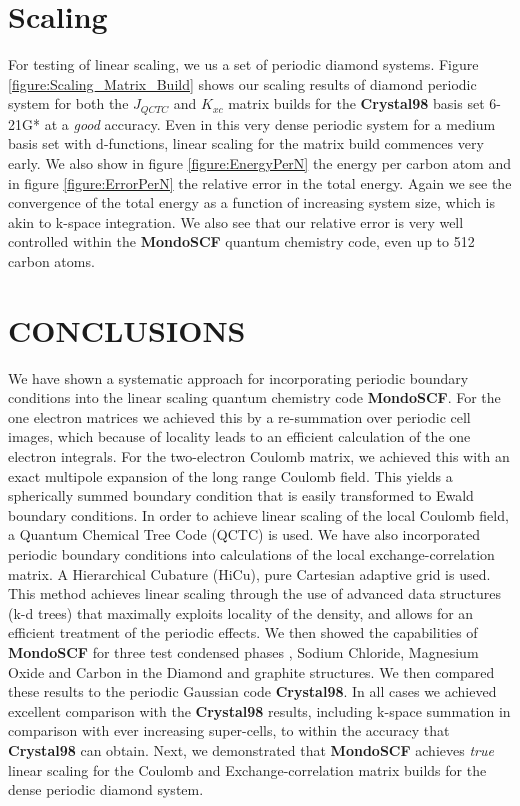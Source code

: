\commentoutA{\documentclass[prb,aps,twocolumn,showpacs,twocolumngrid,superbib]{revtex4}}
\begin{document}
\section{Scaling}

For testing of linear scaling, we us a set of periodic diamond systems.
Figure \ref{figure:Scaling_Matrix_Build} shows our scaling results
of diamond periodic system for both the \( J_{QCTC} \) and \( K_{xc} \)
matrix builds for the \textbf{Crystal98} basis set 6-21G* \cite{C98Basis}
at a {\it good} accuracy. Even in this very dense periodic system for a medium 
basis set with d-functions, linear scaling for the matrix build commences very 
early. We also show in figure \ref{figure:EnergyPerN} the energy per carbon atom and 
in figure \ref{figure:ErrorPerN} the relative error in the total energy. 
Again we see the convergence of the total energy
as a function of increasing system size, which is akin to k-space integration. We also
see that our relative error is very well controlled within the \textbf{MondoSCF} quantum
chemistry code, even up to 512 carbon atoms.


\section{CONCLUSIONS}

We have shown a systematic approach for incorporating periodic boundary conditions
into the linear scaling quantum chemistry code {\bf MondoSCF}.
For the one electron matrices we achieved this by a re-summation
over periodic cell images, which because of locality leads to an efficient
calculation of the one electron integrals. 
For the two-electron Coulomb
matrix, we achieved this with an exact multipole expansion of
the long range Coulomb field. 
This yields a spherically summed boundary
condition that is easily transformed to Ewald boundary conditions.
In order to achieve linear scaling of the local Coulomb field, a Quantum
Chemical Tree Code (QCTC) is used. 
We have also incorporated periodic
boundary conditions into calculations of the local exchange-correlation
matrix. 
A Hierarchical Cubature (HiCu), pure Cartesian adaptive grid
is used. 
This method achieves linear scaling through the use of advanced
data structures (k-d trees) that maximally exploits locality of the
density, and allows for an efficient treatment of the periodic effects.
%
We then showed the capabilities of \textbf{MondoSCF} for three test condensed
phases , Sodium Chloride, Magnesium Oxide and Carbon in the Diamond
and graphite structures. We then compared these results to the periodic
Gaussian code \textbf{Crystal98}. 
In all cases we achieved excellent comparison with the  \textbf{Crystal98}
results, including k-space summation in comparison with ever 
increasing super-cells, to within the accuracy that \textbf{Crystal98} can obtain.
%
Next, we demonstrated that \textbf{MondoSCF} achieves {\it true} linear scaling
for the Coulomb and Exchange-correlation matrix builds for
the dense periodic diamond system.
%
\end{document}
